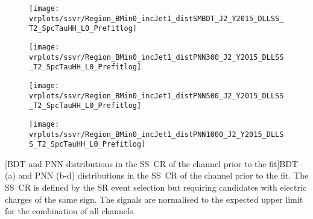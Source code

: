 {
  \centering

  \vspace*{1em}


  \begin{subfigure}{0.495\textwidth}
    \centering

    \texttt{[image: vrplots/ssvr/Region\_BMin0\_incJet1\_distSMBDT\_J2\_Y2015\_DLLSS\_T2\_SpcTauHH\_L0\_Prefitlog]}
    \subcaption{}
  \end{subfigure}\hfill%
  \begin{subfigure}{0.495\textwidth}
    \centering

    \texttt{[image: vrplots/ssvr/Region\_BMin0\_incJet1\_distPNN300\_J2\_Y2015\_DLLSS\_T2\_SpcTauHH\_L0\_Prefitlog]}
    \subcaption{}
  \end{subfigure}

  \begin{subfigure}{0.495\textwidth}
    \centering

    \texttt{[image: vrplots/ssvr/Region\_BMin0\_incJet1\_distPNN500\_J2\_Y2015\_DLLSS\_T2\_SpcTauHH\_L0\_Prefitlog]}
    \subcaption{}
  \end{subfigure}\hfill%
  \begin{subfigure}{0.495\textwidth}
    \centering

    \texttt{[image: vrplots/ssvr/Region\_BMin0\_incJet1\_distPNN1000\_J2\_Y2015\_DLLSS\_T2\_SpcTauHH\_L0\_Prefitlog]}
    \subcaption{}
  \end{subfigure}

  [BDT and PNN distributions in the SS~CR of the \hadhad
  channel prior to the fit]{BDT (a) and PNN (b-d) distributions in the SS~CR of
    the \hadhad channel prior to the fit. The SS~CR is defined by the SR event
    selection but requiring \tauhadvis candidates with electric charges of the
    same sign. The signals are normalised to the expected upper limit for the
    combination of all channels.}
}


